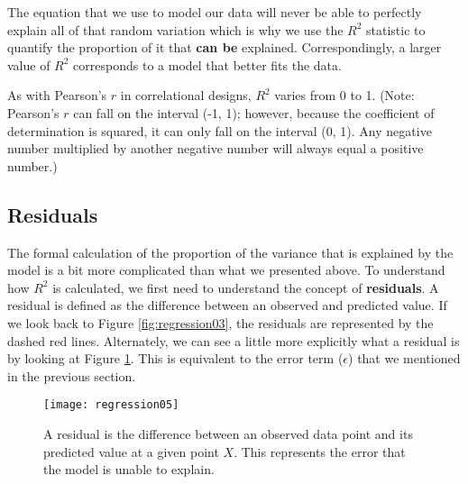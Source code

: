 The equation that we use to model our data will never be able to perfectly explain all of that random variation which is why we use the $R^2$ statistic to quantify the proportion of it that \textbf{can be} explained. Correspondingly, a larger value of $R^2$ corresponds to a model that better fits the data.

As with Pearson's $r$ in correlational designs, $R^2$ varies from 0 to 1. (Note: Pearson's $r$ can fall on the interval (-1, 1); however, because the coefficient of determination is squared, it can only fall on the interval (0, 1). Any negative number multiplied by another negative number will always equal a positive number.)

\subsection{Residuals}

The formal calculation of the proportion of the variance that is explained by the model is a bit more complicated than what we presented above. To understand how $R^2$ is calculated, we first need to understand the concept of \textbf{residuals}. A residual is defined as the difference between an observed and predicted value. If we look back to Figure \ref{fig:regression03}, the residuals are represented by the dashed red lines. Alternately, we can see a little more explicitly what a residual is by looking at Figure \ref{fig:regression05}. This is equivalent to the error term ($\epsilon$) that we mentioned in the previous section.

\begin{figure}[h]
\texttt{[image: regression05]}
\label{fig:regression05}
\caption{A residual is the difference between an observed data point and its predicted value at a given point $X$. This represents the error that the model is unable to explain.}
\end{figure}

